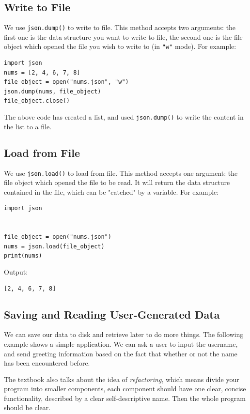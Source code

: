 \documentclass[12pt]{book}
\begin{document}
\subsection{Write to File}
\label{sec:org4cf2af7}
We use \texttt{json.dump()} to write to file. This method accepts two arguments: the first one is the data structure you want to write to file, the second one is the file object which opened the file you wish to write to (in \texttt{"w"} mode). For example:
\begin{verbatim}
import json
nums = [2, 4, 6, 7, 8]
file_object = open("nums.json", "w")
json.dump(nums, file_object)
file_object.close()
\end{verbatim}
The above code has created a list, and used \texttt{json.dump()} to write the content in the list to a file.
\subsection{Load from File}
\label{sec:org5ca2d08}
We use \texttt{json.load()} to load from file. This method accepts one argument: the file object which opened the file to be read. It will return the data structure contained in the file, which can be "catched" by a variable. For example:
\begin{verbatim}
import json


file_object = open("nums.json")
nums = json.load(file_object)
print(nums)
\end{verbatim}
Output:
\begin{verbatim}
[2, 4, 6, 7, 8]
\end{verbatim}
\subsection{Saving and Reading User-Generated Data}
\label{sec:orgdad272e}
We can save our data to disk and retrieve later to do more things. The following example shows a simple application. We can ask a user to input the username, and send greeting information based on the fact that whether or not the name has been encountered before.

The textbook also talks about the idea of \emph{refactoring}, which means divide your program into smaller components, each component should have one clear, concise functionality, described by a clear self-descriptive name. Then the whole program should be clear.
\end{document}
